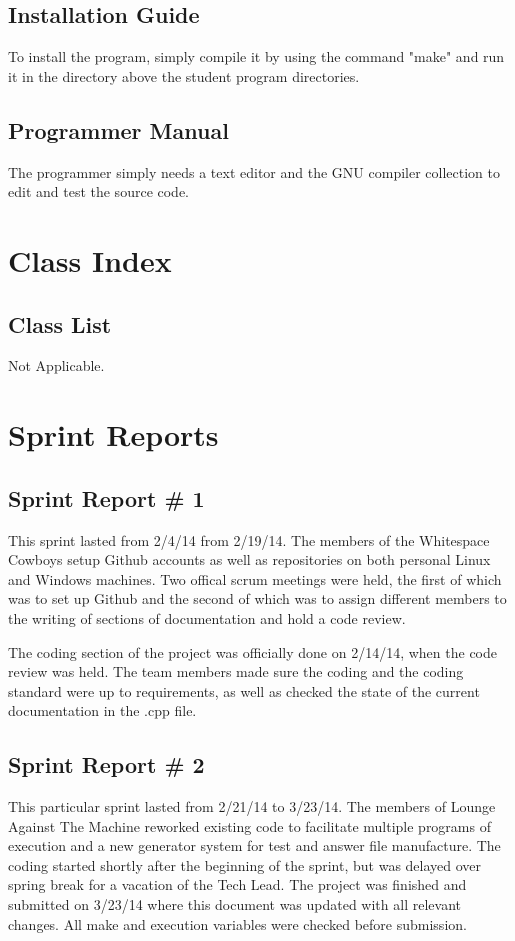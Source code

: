 \documentclass {article}
\begin{document}
			 
		\subsection{\Large{\color{blue}Installation Guide}}
			To install the program, simply compile it by using the command "make" and run it in 
			 the directory above the student program directories.
			 
		\subsection{\Large{\color{blue}Programmer Manual}}
			The programmer simply needs a text editor and the GNU compiler collection to edit
			 and test the source code.
			 
	\newpage
	
	\section{\LARGE{\color{blue}Class Index}}
		\subsection{\Large{\color{blue}Class List}}
			Not Applicable.
			
	\newpage
	
	\section{\LARGE{\color{blue}Sprint Reports}}
		\subsection{\Large{\color{blue}Sprint Report \# 1}}	
			This sprint lasted from 2/4/14 from 2/19/14. The members of the Whitespace Cowboys
			 setup Github accounts as well as repositories on both personal Linux and Windows
			  machines. Two offical scrum meetings were held, the first of which was to set up
			   Github and the second of which was to assign different members to the writing of
			    sections of documentation and hold a code review. 

			The coding section of the project was officially done on 2/14/14, when the code review
			 was held. The team members made sure the coding and the coding standard were up to
			  requirements, as well as checked the state of the current documentation in the .cpp
			   file. 	 
		 
		\subsection{\Large{\color{blue}Sprint Report \# 2}}	
		 	This particular sprint lasted from 2/21/14 to 3/23/14.  The members of Lounge Against
		 	 The Machine reworked existing code to facilitate multiple programs of execution and a
		 	  new generator system for test and answer file manufacture.  The coding started
		 	   shortly after the beginning of the sprint, but was delayed over spring break for a
		 	    vacation of the Tech Lead.  The project was finished and submitted on 3/23/14 where
		 	     this document was updated with all relevant changes.  All make and execution
		 	      variables were checked before submission.
		 
\end{document}
